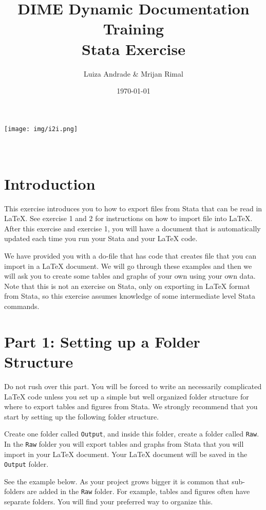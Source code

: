 \documentclass[]{article}
\title{DIME Dynamic Documentation Training \\ Stata Exercise}
\author{Luiza Andrade \& Mrijan Rimal}
\date{\today}
\begin{document}
\makeatletter
\begin{titlepage}
	\begin{center}
		\texttt{[image: img/i2i.png]}\\[10ex]
		{\LARGE \bfseries  \@title }\\[2ex] 
		{\Large  \@author}\\[20ex] 
		{\large \@date}
	\end{center}
\end{titlepage}
\makeatother

\section*{Introduction}
This exercise introduces you to how to export files from Stata that can be read in {\LaTeX}. See exercise 1 and 2 for instructions on how to import file into {\LaTeX}. After this exercise and exercise 1, you will have a document that is automatically updated each time you run your Stata and your {\LaTeX} code.

We have provided you with a do-file that has code that creates file that you can import in a {\LaTeX} document. We will go through these examples and then we will ask you to create some tables and graphs of your own using your own data. Note that this is not an exercise on Stata, only on exporting in {\LaTeX} format from Stata, so this exercise assumes knowledge of some intermediate level Stata commands.

\section*{Part 1: Setting up a Folder Structure}
Do not rush over this part. You will be forced to write an necessarily complicated {\LaTeX} code unless you set up a simple but well organized folder structure for where to export tables and figures from Stata. We strongly recommend that you start by setting up the following folder structure. 

Create one folder called \texttt{Output}, and inside this folder, create a folder called \texttt{Raw}. In the \texttt{Raw} folder you will export tables and graphs from Stata that you will import in your {\LaTeX} document. Your {\LaTeX} document will be saved in the \texttt{Output} folder.

See the example below. As your project grows bigger it is common that sub-folders are added in the \texttt{Raw} folder. For example, tables and figures often have separate folders. You will find your preferred way to organize this.
\end{document}

